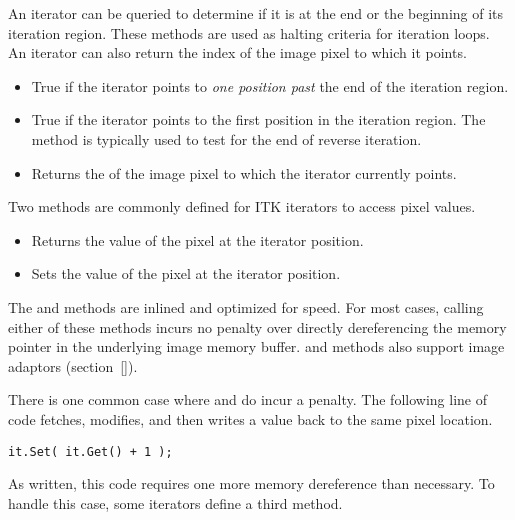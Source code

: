 An iterator can be queried to determine if it is at the end or the beginning of
its iteration region.  These methods are used as halting criteria for iteration
loops.  An iterator can also return the index of the image pixel to which it
points. 

\begin{itemize}
\item \textbf{} True if the iterator points to \emph{one
position past} the end of the iteration region.

\item \textbf{} True if the iterator points to the first
position in the iteration region.  The method is typically used to test for the
end of reverse iteration.

\item \textbf{} Returns the 
of the image pixel to which the iterator currently points.
\end{itemize}


Two methods are commonly defined for ITK iterators to access pixel values.

\begin{itemize}
\item \textbf{} Returns the value of the pixel at the
iterator position.

\item \textbf{}Sets the value of the pixel at the
iterator position.
\end{itemize}

The  and  methods are inlined and optimized for speed. For
most cases, calling either of these methods incurs no penalty over directly
dereferencing the memory pointer in the underlying image memory buffer.
 and  methods also support image adaptors (section~\ref{}).

There is one common case where  and  do incur a penalty.
The following line of code fetches, modifies, and then writes a value back to
the same pixel location.

\begin{verbatim}
it.Set( it.Get() + 1 );
\end{verbatim}

As written, this code requires one more memory dereference than necessary.  To
handle this case, some iterators define a third method.

